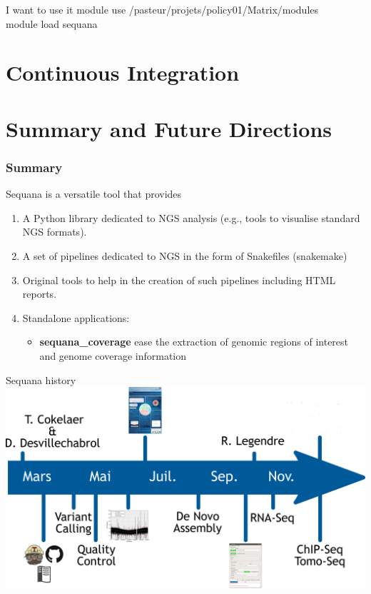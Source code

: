 \documentclass{beamer}
\begin{document}
 
\begin{frame}
\begin{block}{I want to use it}
 module use /pasteur/projets/policy01/Matrix/modules\\
 module load sequana
\end{block} 
\end{frame}


\section{Continuous Integration}



\section{Summary and Future Directions}

\begin{frame}
 \frametitle{Summary}
Sequana is a versatile tool that provides

\begin{enumerate}
 \item A Python library dedicated to NGS analysis (e.g., tools to visualise standard NGS formats).
 \item A set of pipelines dedicated to NGS in the form of Snakefiles (snakemake)
 \item Original tools to help in the creation of such pipelines including HTML reports.
 \item Standalone applications:
 \begin{itemize}
    \item \textbf{sequana\_coverage} ease the extraction of genomic regions of interest and genome coverage information
 \end{itemize}
\end{enumerate}
\end{frame}


\begin{frame}{Sequana history}
    \includegraphics[scale=0.2]{images/timeline}
\end{frame}
\end{document}
